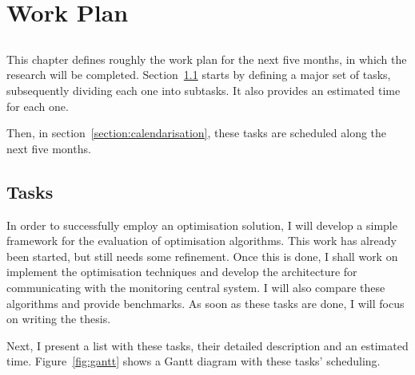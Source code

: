 \chapter{Work Plan}\label{chap:work}

\section*{}

This chapter defines roughly the work plan for the next five months, in which
the research will be completed. Section~\ref{section:tasks} starts by defining
a major set of tasks, subsequently dividing each one into subtasks. It also
provides an estimated time for each one.

Then, in section~\ref{section:calendarisation}, these tasks are scheduled along
the next five months.

\section{Tasks}
\label{section:tasks}

In order to successfully employ an optimisation solution, I will develop a
simple framework for the evaluation of optimisation algorithms. This work has
already been started, but still needs some refinement. Once this is done, I
shall work on implement the optimisation techniques and develop the
architecture for communicating with the monitoring central system. I will also
compare these algorithms and provide benchmarks. As soon as these tasks are
done, I will focus on writing the thesis.

Next, I present a list with these tasks, their detailed description and an
estimated time. Figure~\ref{fig:gantt} shows a Gantt diagram with these tasks'
scheduling.

